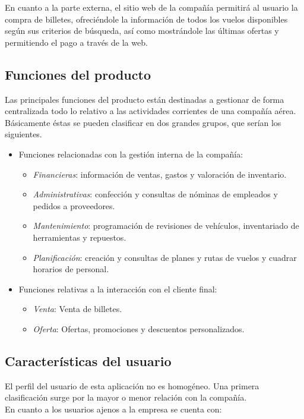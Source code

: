 \documentclass[11pt, a4paper, twoside, titlepage]{article}
\begin{document}
			En cuanto a la parte externa, el sitio web de la compañía permitirá al usuario la compra de billetes, ofreciéndole la información de todos los vuelos disponibles según sus criterios de búsqueda, así como mostrándole las últimas ofertas y permitiendo el pago a través de la web.
			
		\subsection{Funciones del producto}
			Las principales funciones del producto están destinadas a gestionar de forma centralizada todo lo relativo a las actividades corrientes de una compañía aérea. Básicamente éstas se pueden clasificar en dos grandes grupos, que serían los siguientes. \\
			
			\begin{itemize}
				\item Funciones relacionadas con la gestión interna de la compañía:
					\begin{itemize}
						\item \textit{Financieras}: información de ventas, gastos y valoración de inventario.
						\item \textit{Administrativas}: confección y consultas de nóminas de empleados y pedidos a proveedores.
						\item \textit{Mantenimiento}: programación de revisiones de vehículos, inventariado de herramientas y repuestos.
						\item \textit{Planificación}: creación y consultas de planes y rutas de vuelos y cuadrar horarios de personal.			
					\end{itemize}
				\item Funciones relativas a la interacción con el cliente final:
					\begin{itemize}
						\item \textit{Venta}: Venta de billetes.
						\item \textit{Oferta}: Ofertas, promociones y descuentos personalizados.
					\end{itemize}
			\end{itemize}
			
		\subsection{Características del usuario}
			El perfil del usuario de esta aplicación no es homogéneo. Una primera clasificación surge por la mayor o menor relación con la compañía.\\
			En cuanto a los usuarios ajenos a la empresa se cuenta con:
	
\end{document}
